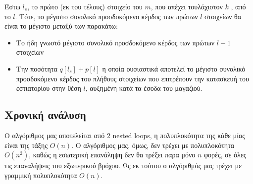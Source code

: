 \documentclass[11pt]{article}
\begin{document}
Έστω \(l_s\), το πρώτο (εκ του τέλους) στοιχείο του \(m\), που απέχει τουλάχιστον
\(k\) , από το \(l\). Τότε, το μέγιστο συνολικό προσδοκόμενο κέρδος των πρώτων \(l\)
στοιχείων θα είναι το μέγιστο μεταξύ των παρακάτω:
\begin{itemize}
\item Το ήδη γνωστό μέγιστο συνολικό προσδοκόμενο κέρδος των πρώτων \(l-1\) στοιχείων
\item Την ποσότητα \(q[l_s] + p[l]\) η οποία ουσιαστικά αποτελεί το μέγιστο συνολικό
προσδοκόμενο κέρδος του πλήθους στοιχείων που επιτρέπουν την κατασκευή του
εστιατορίου στην θέση \(l\), αυξημένη κατά τα έσοδα του μαγαζιού.
\end{itemize}
\subsection{Χρονική ανάλυση}
\label{sec:org9db584c}
Ο αλγόριθμος μας αποτελείται από 2 nested loops, η πολυπλοκότητα της κάθε μίας
είναι της τάξης \(O(n)\). Ο αλγόριθμος μας, όμως, δεν τρέχει με πολυπλοκότητα
\(O(n^2)\), καθώς η εσωτερική επανάληψη δεν θα τρέξει παρα μόνο \(n\) φορές, σε όλες
τις επαναλήψεις του εξωτερικού βρόχου. Ως εκ τούτου ο αλγόριθμός μας τρέχει με γραμμική
πολυπλοκότητα \(O(n)\). 
\end{document}
